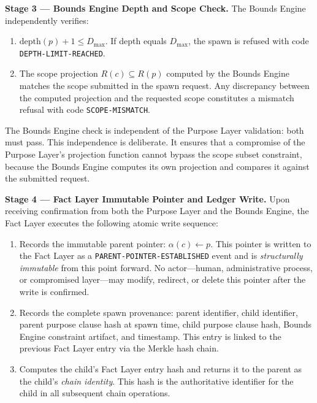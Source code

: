 \bigskip
\noindent\textbf{Stage 3 — Bounds Engine Depth and Scope Check.} The Bounds Engine independently verifies:

\begin{enumerate}
  \item[(BE-V1)] $\mathrm{depth}(p) + 1 \leq D_{\max}$. If depth equals $D_{\max}$, the spawn is refused with code \texttt{DEPTH-LIMIT-REACHED}.
  \item[(BE-V2)] The scope projection $R(c) \subseteq R(p)$ computed by the Bounds Engine matches the scope submitted in the spawn request. Any discrepancy between the computed projection and the requested scope constitutes a mismatch refusal with code \texttt{SCOPE-MISMATCH}.
\end{enumerate}

The Bounds Engine check is independent of the Purpose Layer validation: both must pass. This independence is deliberate. It ensures that a compromise of the Purpose Layer's projection function cannot bypass the scope subset constraint, because the Bounds Engine computes its own projection and compares it against the submitted request.

\bigskip
\noindent\textbf{Stage 4 — Fact Layer Immutable Pointer and Ledger Write.} Upon receiving confirmation from both the Purpose Layer and the Bounds Engine, the Fact Layer executes the following atomic write sequence:

\begin{enumerate}
  \item[(FL-W1)] Records the immutable parent pointer: $\alpha(c) \gets p$. This pointer is written to the Fact Layer as a \texttt{PARENT-POINTER-ESTABLISHED} event and is \emph{structurally immutable} from this point forward. No actor—human, administrative process, or compromised layer—may modify, redirect, or delete this pointer after the write is confirmed.
  \item[(FL-W2)] Records the complete spawn provenance: parent identifier, child identifier, parent purpose clause hash at spawn time, child purpose clause hash, Bounds Engine constraint artifact, and timestamp. This entry is linked to the previous Fact Layer entry via the Merkle hash chain.
  \item[(FL-W3)] Computes the child's Fact Layer entry hash and returns it to the parent as the child's \emph{chain identity}. This hash is the authoritative identifier for the child in all subsequent chain operations.
\end{enumerate}

